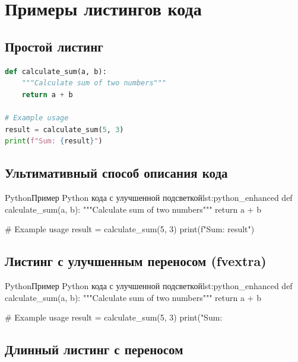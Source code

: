 \section{Примеры листингов кода}

\subsection{Простой листинг}

\begin{lstlisting}[language=Python, caption={Пример простого алгоритма}, label={lst:simple_algorithm}]
def calculate_sum(a, b):
    """Calculate sum of two numbers"""
    return a + b

# Example usage
result = calculate_sum(5, 3)
print(f"Sum: {result}")
\end{lstlisting}

\subsection{Ультимативный способ описания кода}

\begin{CodeBlock}{Python}{Пример Python кода с улучшенной подсветкой}{lst:python_enhanced}
def calculate_sum(a, b):
    """Calculate sum of two numbers"""
    return a + b

# Example usage
result = calculate_sum(5, 3)
print(f"Sum: {result}")
\end{CodeBlock}

\subsection{Листинг с улучшенным переносом (fvextra)}

\begin{CodeBlock}{Python}{Пример Python кода с улучшенной подсветкой}{lst:python_enhanced}
def calculate_sum(a, b):
    """Calculate sum of two numbers"""
    return a + b

# Example usage
result = calculate_sum(5, 3)
print("Sum: %
\end{CodeBlock}

\subsection{Длинный листинг с переносом}

